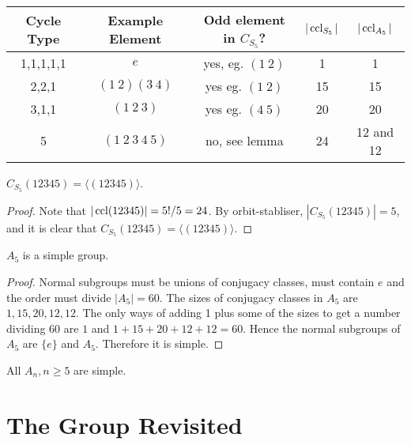 \documentclass[10pt]{article}
\def\ge{\geqslant}
\begin{document}
      \begin{example}
        \begin{center}
            \begin{tabular}{c|c|c|c|c}
                Cycle Type & Example Element & Odd element in $C_{S_5}$? & $|\operatorname{ccl}_{S_5}|$ & $|\operatorname{ccl}_{A_5}|$ \\
                \hline 
                1,1,1,1,1 & $e$ & yes, eg. $(1\ 2)$ & 1 & 1\\
                2,2,1 & $(1\ 2)(3\ 4)$ & yes eg. $(1\ 2)$ & 15 & 15\\
                3,1,1 & $(1\ 2\ 3)$ & yes eg. $(4\ 5)$ & 20 & 20\\
                5 & $(1\ 2\ 3\ 4\ 5)$ & no, see lemma & 24 & 12 and 12\\
            \end{tabular}
        \end{center}
        \begin{lemma}\label{lma:5.31}
            $ C_{S_5}(12345)=\langle (12345) \rangle $.
        \end{lemma}
        \begin{proof}
            Note that $ |\operatorname{ccl}(12345)|=5!/5=24 $. By orbit-stabliser, $ |C_{S_5}(12345)|=5 $, and it is clear that $C_{S_5}(12345)=\langle (12345) \rangle$.
        \end{proof}
      \end{example}
      \begin{theorem}\label{thm:5.32}
          $A_5$ is a simple group.
      \end{theorem}
      \begin{proof}
          Normal subgroups must be unions of conjugacy classes, must contain $e$ and the order must divide $|A_5|=60$. The sizes of conjugacy classes in $A_5$ are $1,15,20,12,12$. The only ways of adding 1 plus some of the sizes to get a number dividing 60 are $ 1 $ and $ 1+15+20+12+12=60 $. Hence the normal subgroups of $A_5$ are $\{e\}$ and $A_5$. Therefore it is simple. 
      \end{proof}
      \begin{remark}
          All $A_n, n\ge 5$ are simple.
      \end{remark}
      
      \section{The \mobius Group Revisited}
\end{document}
